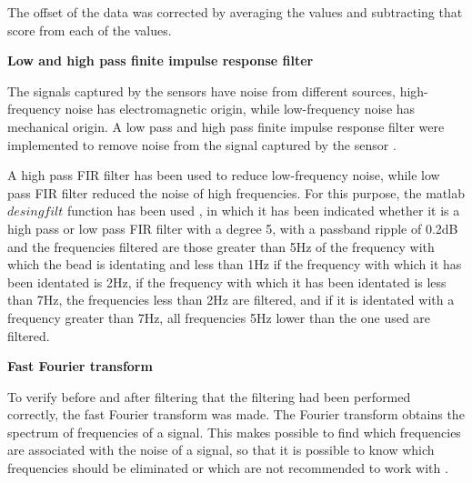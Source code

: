 \documentclass[12pt, a4paper]{article} %
\begin{document}
\setlength{\parindent}{8pt}
\setlength{\parskip}{4mm}

The offset of the data was corrected by averaging the values and subtracting that score from each of the values.

\setlength{\parindent}{0pt}
\setlength{\parskip}{8mm}
\textbf{Low and high pass finite impulse response filter}
\setlength{\parskip}{0mm}

The signals captured by the sensors have noise from different sources, high-frequency noise has electromagnetic origin, while low-frequency noise has mechanical origin. A low pass and high pass finite impulse response filter were implemented to remove noise from the signal captured by the sensor \cite{mondal2012novel}. 

\setlength{\parskip}{4mm}
\setlength{\parindent}{8pt}

A high pass FIR filter has been used to reduce low-frequency noise, while low pass FIR filter reduced the noise of high frequencies. For this purpose, the matlab $desingfilt$ function has been used \cite{jacob2015digital}, in which it has been indicated whether it is a high pass or low pass FIR filter with a degree 5, with a passband ripple of 0.2dB and the frequencies filtered are those greater than 5Hz of the frequency with which the bead is identating and less than 1Hz if the frequency with which it has been identated is 2Hz, if the frequency with which it has been identated is less than 7Hz, the frequencies less than 2Hz are filtered, and if it is identated with a frequency greater than 7Hz, all frequencies 5Hz lower than the one used are filtered.

\setlength{\parindent}{0pt}
\setlength{\parskip}{8mm}
\textbf{Fast Fourier transform}
\setlength{\parskip}{0mm}

To verify before and after filtering that the filtering had been performed correctly, the fast Fourier transform was made. The Fourier transform obtains the spectrum of frequencies of a signal. This makes possible to find which frequencies are associated with the noise of a signal, so that it is possible to know which frequencies should be eliminated or which are not recommended to work with \cite{de2001transformada}.
\end{document}
